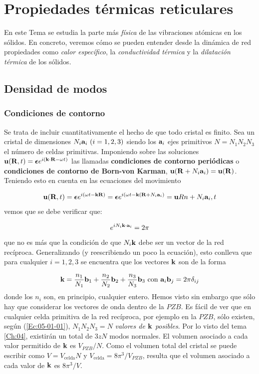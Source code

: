 \chapter{Propiedades térmicas reticulares} \label{Ch:05}

En este Tema se estudia la parte más \textit{física} de las vibraciones atómicas en los sólidos. En concreto, veremos cómo se pueden entender desde la dinámica de red propiedades como \textit{calor específico}, la \textit{conductividad térmica} y la \textit{dilatación térmica} de los sólidos.

\section{Densidad de modos}

\subsection{Condiciones de contorno}

Se trata de incluir cuantitativamente el hecho de que todo cristal es finito. Sea un cristal de dimensiones $N_i \mathbf{a}_i  \ (i=1,2,3)$ siendo los $\mathbf{a}_i$ ejes primitivos $N=N_1N_2N_3$ el número de celdas primitivas. Imponiendo sobre las soluciones $\mathbf{u}(\mathbf{R},t)= \boldsymbol{\epsilon} e^{i(\mathbf{k} \cdot \mathbf{R} - \omega t)}$ las llamadas \textbf{condiciones de contorno periódicas} o \textbf{condiciones de contorno de Born-von Karman}, $\mathbf{u}(\mathbf{R} + N_i \mathbf{a}_i) = \mathbf{u} (\mathbf{R})$. Teniendo esto en cuenta en las ecuaciones del movimiento

\begin{equation*}
	\mathbf{u}(\mathbf{R},t) =\boldsymbol{\epsilon} e^{i(\omega t - \mathbf{k} \mathbf{R})} = \boldsymbol{\epsilon} e^{i(\omega t - \mathbf{k} (\mathbf{R}+N_i\mathbf{a}_i)} = \mathbf{u}{Rn+N_i\mathbf{a}_i,t} 
\end{equation*}
vemos que se debe verificar que:

\begin{equation*}
	e^{i N_i \mathbf{k} \cdot \mathbf{a}_i} = 2 \pi
\end{equation*}
que no es más que la condición de que $N_i \mathbf{k}$ debe ser un vector de la red recíproca. Generalizando (y reescribiendo un poco la ecuación), esto conlleva que para cualquier $i=1,2,3$ se encuentra que los vectores $\mathbf{k}$ son de la forma

\begin{equation}
	\mathbf{k} = \frac{n_1}{N_1} \mathbf{b}_1 + \frac{n_2}{N_2} \mathbf{b}_2 + \frac{n_3}{N_3} \mathbf{b}_3 \ \text{con} \ \mathbf{a}_i \mathbf{b}_j = 2 \pi \delta_{ij} \label{Ec:05-01-01}
\end{equation}
donde los $n_i$ son, en principio, cualquier entero. Hemos visto sin embargo que sólo hay que considerar los vectores de onda dentro de la $PZB$. Es fácil de ver que en cualquier celda primitiva de la red recíproca, por ejemplo en la $PZB$, sólo existen, según (\ref{Ec:05-01-01}), $N_1N_2N_3=N$ \textit{valores de $\mathbf{k}$ posibles}. Por lo visto del tema \ref{Ch:04}, existirán un total de $3zN$ modos normales. El volumen asociado a cada valor permitido de $\mathbf{k}$ es $V_{PZB}/N$. Como el volumen total del cristal se puede escribir como $V=V_{\text{celda}} N$ y $V_{\text{celda}} = 8 \pi^3 /V_{PZB}$, resulta que el volumen asociado a cada valor de $\mathbf{k}$ es $8 \pi^3/ V$.

